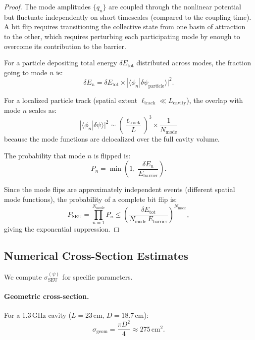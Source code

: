 \documentclass[11pt,twocolumn]{article}
\theoremstyle{definition}
\theoremstyle{remark}
\begin{document}
\begin{proof}
The mode amplitudes $\{q_n\}$ are coupled through the nonlinear
potential but fluctuate independently on short timescales (compared to
the coupling time). A bit flip requires transitioning the collective
state from one basin of attraction to the other, which requires
perturbing each participating mode by enough to overcome its contribution
to the barrier.

For a particle depositing total energy $\delta E_{\mathrm{tot}}$
distributed across modes, the fraction going to mode $n$ is:
\begin{equation}
\delta E_n = \delta E_{\mathrm{tot}} \times |\langle\phi_n|\delta\psi_{\mathrm{particle}}\rangle|^2.
\end{equation}

For a localized particle track (spatial extent $\ell_{\mathrm{track}}
\ll L_{\mathrm{cavity}}$), the overlap with mode $n$ scales as:
\begin{equation}
|\langle\phi_n|\delta\psi\rangle|^2 \sim \left(\frac{\ell_{\mathrm{track}}}{L}\right)^3
\times \frac{1}{N_{\mathrm{mode}}}
\end{equation}
because the mode functions are delocalized over the full cavity volume.

The probability that mode $n$ is flipped is:
\begin{equation}
P_n = \min\!\left(1,\;\frac{\delta E_n}{E_{\mathrm{barrier}}}\right).
\end{equation}

Since the mode flips are approximately independent events (different
spatial mode functions), the probability of a complete bit flip is:
\begin{equation}
P_{\mathrm{SEU}} = \prod_{n=1}^{N_{\mathrm{mode}}} P_n
\leq \left(\frac{\delta E_{\mathrm{tot}}}{N_{\mathrm{mode}}\,E_{\mathrm{barrier}}}\right)^{N_{\mathrm{mode}}},
\end{equation}
giving the exponential suppression.
\end{proof}

\subsection{Numerical Cross-Section Estimates}\label{sec:seu_numbers}

We compute $\sigma_{\mathrm{SEU}}^{(\psi)}$ for specific parameters.

\paragraph{Geometric cross-section.}
For a 1.3\,GHz cavity ($L = 23\,\mathrm{cm}$, $D = 18.7\,\mathrm{cm}$):
\begin{equation}
\sigma_{\mathrm{geom}} = \frac{\pi D^2}{4} \approx 275\,\mathrm{cm}^2.
\end{equation}
\end{document}
